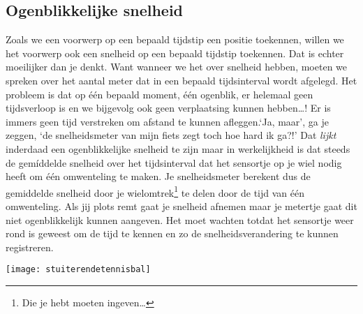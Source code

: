 \documentclass{ximera}
\begin{document}
	\subsection{Ogenblikkelijke snelheid}
	
	Zoals we een voorwerp op een bepaald tijdstip een positie toekennen, willen we het voorwerp ook een snelheid op een bepaald tijdstip toekennen. Dat is echter moeilijker dan je denkt. Want wanneer we het over snelheid hebben, moeten we spreken over het aantal meter dat in een bepaald tijds\-in\-ter\-val wordt afgelegd. Het probleem is dat op \'e\'en bepaald moment, \'e\'en ogenblik, er helemaal geen tijdsverloop is en we bijgevolg ook geen verplaatsing kunnen hebben\ldots! Er is immers geen tijd verstreken om afstand te kunnen afleggen.`Ja, maar', ga je zeggen, `de snelheidsmeter van mijn fiets zegt toch hoe hard ik ga?!' Dat \emph{lijkt} inderdaad een ogenblikkelijke snelheid te zijn maar in werkelijkheid is dat steeds de gem\'iddelde snelheid over het \mbox{tijds}\-in\-ter\-val dat het sensortje op je wiel nodig heeft om \'e\'en omwenteling te maken. Je snelheidsmeter berekent dus de gemiddelde snelheid door je wielomtrek\footnote{Die je hebt moeten ingeven\ldots} te delen door de tijd van \'e\'en omwenteling. Als jij plots remt gaat je snelheid afnemen maar je metertje gaat dit niet ogenblikkelijk kunnen aangeven. Het moet wachten totdat het sensortje weer rond is geweest om de tijd te kennen en zo de snelheidsverandering te kunnen registreren.
	\begin{image}
	
	\texttt{[image: stuiterendetennisbal]}
	\end{image}
	
\end{document}
